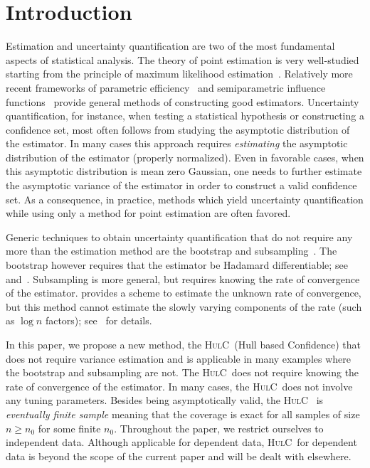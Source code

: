 \documentclass{article}
\newcommand{\hulc}{\textsc{HulC}~}
\numberwithin{myalgctr}{section}
\begin{document}
\section{Introduction}\label{sec:intro}
Estimation and uncertainty quantification are two of the most fundamental aspects of statistical analysis. The theory of point estimation is very well-studied starting from the principle of maximum likelihood estimation~\citep{stigler2007epic,pfanzagl2011parametric,lehmann2006theory}. Relatively more recent frameworks of parametric efficiency~\citep[Chapters 4--8]{van2000asymptotic} and semiparametric influence functions~\citep{bickel1993efficient} provide general methods of constructing good estimators. Uncertainty quantification, for instance{\color{black}, when} testing a statistical hypothesis or constructing a confidence set, most often follows from studying the asymptotic distribution of the estimator. In many cases this approach requires \emph{estimating} the asymptotic distribution of the estimator {\color{black}(properly normalized)}. Even in favorable cases, when this asymptotic distribution is mean zero Gaussian, one needs to further estimate the asymptotic variance of the estimator
in order to construct a valid confidence set. As a consequence, in practice, methods which yield uncertainty quantification while using only a method for point estimation are often favored. 

Generic techniques to obtain uncertainty quantification that do not require any more than the estimation method are the bootstrap and subsampling~\citep{efron1979bootstrap,politis1994large,shao2012jackknife,hall2013bootstrap}. 
The bootstrap however requires that the estimator 
be Hadamard differentiable;
see~\cite{dumbgen1993nondifferentiable} and~\citet[Section 3.2]{shao2012jackknife}. 
Subsampling is more general,
but requires knowing the rate of convergence of the
estimator. \cite{bertail1999subsampling} provides a scheme to estimate
the unknown rate of convergence, but this method 
cannot estimate the
slowly varying components of the rate (such as $\log n$ factors);
see~\citet[page 3]{sherman1997omnibus} for details. 


In this paper, we propose a new method,
the \hulc (Hull based Confidence)
that does not
require variance estimation and is applicable in many examples where
the bootstrap and subsampling are not. 
The \hulc does not
require knowing the rate of convergence of the estimator. 
In many cases, the \hulc does not involve any tuning
parameters. 
Besides being asymptotically valid,
the \hulc
is {\em eventually finite sample} 
meaning that the coverage is exact
for all samples of size $n\geq n_0$
for some finite $n_0$. {\color{black}Throughout the paper, we restrict ourselves to independent data.
Although applicable for dependent data, \hulc for dependent data is beyond the scope of the current paper and will be dealt with elsewhere.}
\end{document}
